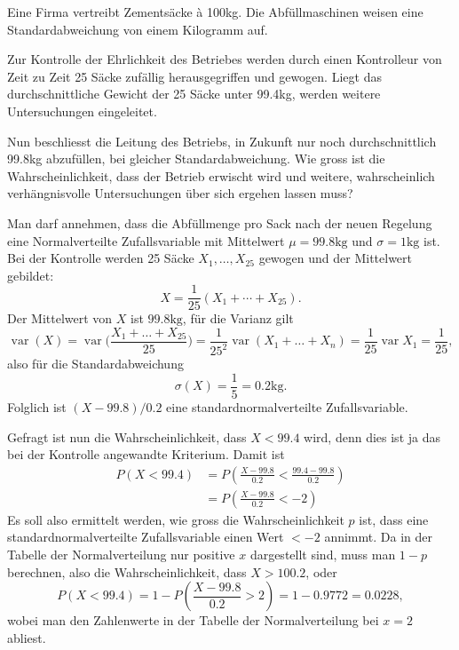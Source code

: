 Eine Firma vertreibt Zementsäcke \`a 100kg. Die Abfüllmaschinen weisen
eine Standardabweichung von einem Kilogramm auf.

Zur Kontrolle der Ehrlichkeit des Betriebes werden durch einen Kontrolleur
von Zeit zu Zeit 25 Säcke zufällig herausgegriffen und gewogen. Liegt
das durchschnittliche Gewicht der 25 Säcke unter 99.4kg, werden weitere
Untersuchungen eingeleitet.

Nun beschliesst die Leitung des Betriebs, in Zukunft nur noch durchschnittlich
99.8kg abzufüllen, bei gleicher Standardabweichung. Wie gross ist die
Wahrscheinlichkeit, dass der Betrieb erwischt wird und weitere, wahrscheinlich
verhängnisvolle Untersuchungen über sich ergehen lassen muss?


\begin{loesung}
Man darf annehmen, dass die Abfüllmenge pro Sack nach der neuen Regelung
eine Normalverteilte Zufallsvariable mit Mittelwert $\mu=99.8\text{kg}$ und
$\sigma=1\text{kg}$ ist. Bei der Kontrolle werden 25 Säcke $X_1,\dots,X_{25}$
gewogen und der Mittelwert gebildet:
\[
X=\frac1{25}(X_1+\cdots +X_{25}).
\]
Der Mittelwert von $X$ ist $99.8\text{kg}$, für die Varianz gilt
\[
\operatorname{var}(X)
=
\operatorname{var}\biggl(
\frac{X_1+\dots+X_25}{25}
\biggr)
=
\frac1{25^2}\operatorname{var}(X_1+\dots+X_n)
=
\frac1{25}\operatorname{var}{X_1}
=
\frac1{25},
\]
also für die Standardabweichung
\[
\sigma(X)=\frac15=0.2\text{kg}.
\]
Folglich ist $(X-99.8)/0.2$ eine standardnormalverteilte Zufallsvariable.

Gefragt ist nun die Wahrscheinlichkeit, dass $X<99.4$ wird, denn dies ist ja
das bei der Kontrolle angewandte Kriterium. Damit ist
\begin{align*}
P(X<99.4)
&=P\left(\frac{X-99.8}{0.2} < \frac{99.4-99.8}{0.2}\right)\\
&=P\left(\frac{X-99.8}{0.2} < -2\right)
\end{align*}
Es soll also ermittelt werden, wie gross die Wahrscheinlichkeit $p$ ist, dass
eine standardnormalverteilte Zufallsvariable einen Wert $<-2$ annimmt.
Da in der Tabelle der Normalverteilung nur positive $x$ dargestellt sind,
muss man $1-p$ berechnen, also die Wahrscheinlichkeit, dass $X>100.2$,
oder
\[
P(X<99.4)=1-P\left(\frac{X-99.8}{0.2}>2\right)
=1-0.9772=0.0228,
\]
wobei man den Zahlenwerte in der Tabelle der Normalverteilung bei $x=2$ abliest.
\end{loesung}


